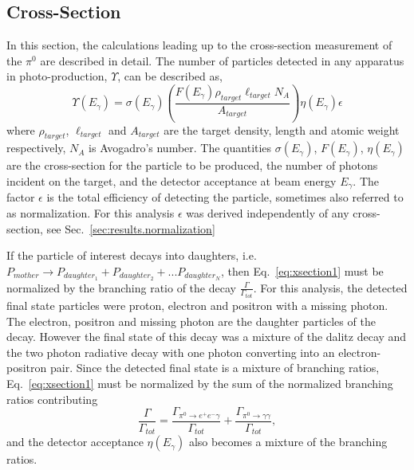 \subsection{Cross-Section}\label{sec:results.xsection}

In this section, the calculations leading up to the cross-section measurement of the $\pi^0$ are described in detail. The number of particles detected in any apparatus in photo-production, $\Upsilon$, can be described as,
\begin{equation}\label{eq:xsection1}
\Upsilon(E_\gamma) = \sigma(E_\gamma) \left(\frac{F(E_\gamma) \rho_{target}\ell_{target}N_A}{A_{target}}\right)\eta(E_\gamma)\epsilon
\end{equation}
where $\rho_{target}$, $\ell_{target}$ and $A_{target}$ are the target density, length and atomic weight respectively, $N_A$ is Avogadro's number. The quantities $\sigma(E_\gamma)$, $F(E_\gamma)$, $\eta(E_\gamma)$ are the cross-section for the particle to be produced, the number of photons incident on the target, and the detector acceptance at beam energy $E_\gamma$. The factor $\epsilon$ is the total efficiency of detecting the particle, sometimes also referred to as normalization. For this analysis $\epsilon$ was derived independently of any cross-section, see Sec.~\ref{sec:results.normalization}

If the particle of interest decays into daughters, i.e. $P_{mother}\rightarrow P_{daughter_1} +P_{daughter_2} + ...P_{daughter_N}$, then Eq.~\ref{eq:xsection1} must be normalized by the branching ratio of the decay $\frac{\Gamma}{\Gamma_{tot}}$. For this analysis, the detected final state particles were proton, electron and positron with a missing photon. The electron, positron and missing photon are the daughter particles of the \pizT decay. However the final state of this decay was a mixture of the \pizT dalitz decay and the \pizT two photon radiative decay with one photon converting into an electron-positron pair. Since the detected final state is a mixture of branching ratios, Eq.~\ref{eq:xsection1} must be normalized by the sum of the normalized branching ratios contributing
\begin{equation}\label{eq:xsectionBR}
 \frac{\Gamma}{\Gamma_{tot}} = \frac{\Gamma_{\pi^{0}\rightarrow e^{+}e^{-}\gamma}}{\Gamma_{tot}} + \frac{\Gamma_{\pi^{0}\rightarrow \gamma \gamma}}{\Gamma_{tot}},
\end{equation}
and the detector acceptance $\eta(E_\gamma)$ also becomes a mixture of the branching ratios.

